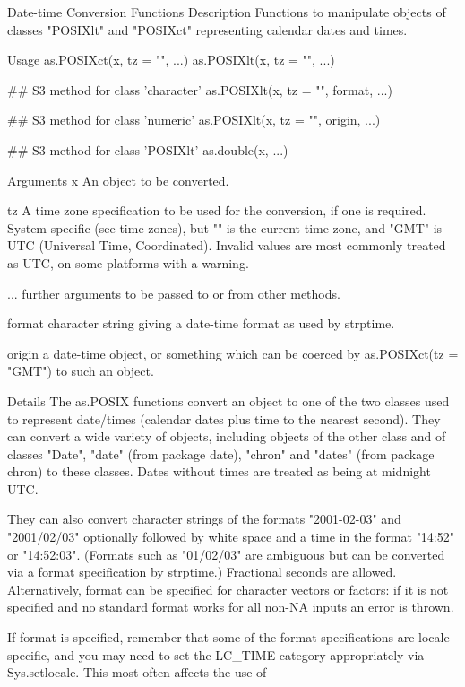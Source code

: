 Date-time Conversion Functions
Description
Functions to manipulate objects of classes "POSIXlt" and "POSIXct" representing calendar dates and times. 

Usage
as.POSIXct(x, tz = "", ...)
as.POSIXlt(x, tz = "", ...)

## S3 method for class 'character'
as.POSIXlt(x, tz = "", format, ...)

## S3 method for class 'numeric'
as.POSIXlt(x, tz = "", origin, ...)

## S3 method for class 'POSIXlt'
as.double(x, ...)

Arguments
x An object to be converted.
 
tz A time zone specification to be used for the conversion, if one is required. System-specific (see time zones), but "" is the current time zone, and "GMT" is UTC (Universal Time, Coordinated). Invalid values are most commonly treated as UTC, on some platforms with a warning.
 
... further arguments to be passed to or from other methods.
 
format character string giving a date-time format as used by strptime.
 
origin a date-time object, or something which can be coerced by as.POSIXct(tz = "GMT") to such an object.
 

Details
The as.POSIX      functions convert an object to one of the two classes used to represent date/times (calendar dates plus time to the nearest second). They can convert a wide variety of objects, including objects of the other class and of classes "Date", "date" (from package date), "chron" and "dates" (from package chron) to these classes. Dates without times are treated as being at midnight UTC. 

They can also convert character strings of the formats "2001-02-03" and "2001/02/03" optionally followed by white space and a time in the format "14:52" or "14:52:03". (Formats such as "01/02/03" are ambiguous but can be converted via a format specification by strptime.) Fractional seconds are allowed. Alternatively, format can be specified for character vectors or factors: if it is not specified and no standard format works for all non-NA inputs an error is thrown. 

If format is specified, remember that some of the format specifications are locale-specific, and you may need to set the LC_TIME category appropriately via Sys.setlocale. This most often affects the use of %

